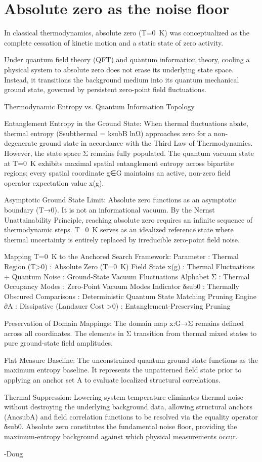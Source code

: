 \chapter{Absolute zero as the noise floor}

In classical thermodynamics, absolute zero (T=0 K) was conceptualized as the complete cessation of kinetic motion and a static state of zero activity.

Under quantum field theory (QFT) and quantum information theory, cooling a physical system to absolute zero does not erase its underlying state space. Instead, it transitions the background medium into its quantum mechanical ground state, governed by persistent zero-point field fluctuations.

Thermodynamic Entropy vs. Quantum Information Topology

Entanglement Entropy in the Ground State: When thermal fluctuations abate, thermal entropy (Ssubthermal = ksubB lnΩ) approaches zero for a non-degenerate ground state in accordance with the Third Law of Thermodynamics. However, the state space Σ remains fully populated. The quantum vacuum state at T=0 K exhibits maximal spatial entanglement entropy across bipartite regions; every spatial coordinate g∈G maintains an active, non-zero field operator expectation value x(g).

Asymptotic Ground State Limit: Absolute zero functions as an asymptotic boundary (T→0). It is not an informational vacuum. By the Nernst Unattainability Principle, reaching absolute zero requires an infinite sequence of thermodynamic steps. T=0 K serves as an idealized reference state where thermal uncertainty is entirely replaced by irreducible zero-point field noise.

Mapping T=0 K to the Anchored Search Framework: Parameter : Thermal Region (T>0) : Absolute Zero (T=0 K) Field State x(g) : Thermal Fluctuations + Quantum Noise	: Ground-State Vacuum Fluctuations Alphabet Σ : Thermal Occupancy Modes : Zero-Point Vacuum Modes Indicator δsub0 : Thermally Obscured Comparisons : Deterministic Quantum State Matching Pruning Engine ∂A : Dissipative (Landauer Cost >0) : Entanglement-Preserving Pruning

Preservation of Domain Mappings: The domain map x:G→Σ remains defined across all coordinates. The elements in Σ transition from thermal mixed states to pure ground-state field amplitudes.

Flat Measure Baseline: The unconstrained quantum ground state functions as the maximum entropy baseline. It represents the unpatterned field state prior to applying an anchor set A to evaluate localized structural correlations.

Thermal Suppression: Lowering system temperature eliminates thermal noise without destroying the underlying background data, allowing structural anchors (AncsubA​) and field correlation functions to be resolved via the equality operator δsub0. Absolute zero constitutes the fundamental noise floor, providing the maximum-entropy background against which physical measurements occur.

-Doug

